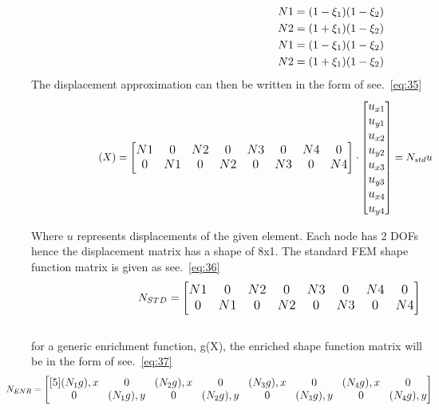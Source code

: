\documentclass[fleqn, 12.5pt,a4paper]{report}
\begin{document}
\begin{align}\label{eq:31}
\hspace{6.25cm}N1 = (1-\xi_1)(1-\xi_2) \\
\hspace{6.25cm}N2 = (1+\xi_1)(1-\xi_2) \\ 
\hspace{6.25cm}N1 = (1-\xi_1)(1-\xi_2) \\
\hspace{6.25cm}N2 = (1+\xi_1)(1-\xi_2)  
\end{align}
\vspace{-1.5cm}
The displacement approximation \cite{khoei2014extended} can then be written in the form of see.~\autoref{eq:35}
\begin{align}\label{eq:35}
\hspace{2.25cm}(X) = \large \begin{bmatrix}
N1 & 0 & N2 & 0 & N3 & 0 & N4 & 0\\
0 & N1 & 0 & N2 & 0 & N3 & 0 & N4\\
\end{bmatrix} \large
\cdot
\large \begin{bmatrix}
u_{x1}\\
u_{y1}\\
u_{x2}\\
u_{y2}\\
u_{x3}\\
u_{y3}\\
u_{x4}\\
u_{y4}\\
\end{bmatrix} \large
= N_{std}u
\end{align}

Where $u$ represents displacements of the given element. Each node has 2 DOFs hence the displacement matrix has a shape of 8x1. The standard FEM shape function matrix is given as see.~\autoref{eq:36}
\\
\begin{align}\label{eq:36}
\hspace{3cm}N_{STD} = \large \begin{bmatrix}
N1 & 0 & N2 & 0 & N3 & 0 & N4 & 0\\
0 & N1 & 0 & N2 & 0 & N3 & 0 & N4\\
\end{bmatrix} \large
\end{align}
\\
for a generic enrichment function, g(X), the enriched shape function matrix\cite{khoei2014extended} will be in the form of see.~\autoref{eq:37}
\begin{align}\label{eq:37}
\hspace{-1cm}N_{ENR} = \large \begin{bmatrix}[5]
(N_1g),x & 0 & (N_2g),x & 0 & (N_3g),x & 0 & (N_4g),x & 0 \\
0 & (N_1g),y & 0 & (N_2g),y & 0 &(N_3g),y & 0 & (N_4g),y
\end{bmatrix} \large
\end{align}
\end{document}
